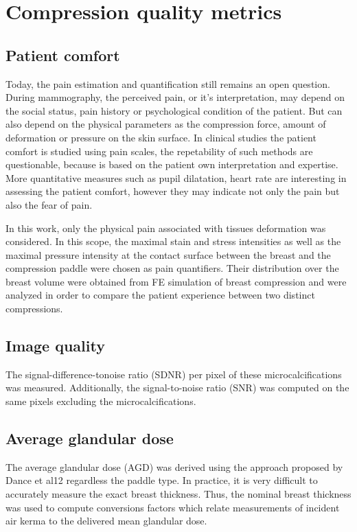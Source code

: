 \section{Compression quality metrics}\label{section:compressionqualitymetrics}
\subsection{Patient comfort}

Today, the pain estimation and quantification still remains an open question. During mammography, the perceived pain, or it's interpretation, may depend on the social status, pain history or psychological condition of the patient. But can also depend on the physical parameters as the compression force, amount of deformation or pressure on the skin surface. In clinical studies the patient comfort is studied using pain scales, the repetability of such methods are questionable, because is based on the patient own interpretation and expertise. More quantitative measures such as pupil dilatation, heart rate are interesting in assessing the patient comfort, however they may indicate not only the pain but also the fear of  pain.        

In this work, only the physical pain associated with tissues deformation was considered. In this scope, the maximal stain and stress intensities as well as the maximal pressure intensity at the contact surface between the breast and the compression paddle were chosen as pain quantifiers. Their distribution over the breast volume were obtained from FE simulation of breast compression and  were analyzed in order to compare the patient experience between two distinct compressions. 

\subsection{Image quality }\label{section:averagegalndulardose}
 The signal-difference-tonoise ratio (SDNR) per pixel of these microcalcifications was measured. Additionally, the signal-to-noise ratio (SNR) was computed on the same pixels excluding the microcalcifications.  




\subsection{ Average glandular dose}
The average glandular dose (AGD) was derived using the approach proposed by Dance et al12 regardless the paddle type.  In practice, it is very difficult to accurately measure the exact breast thickness. Thus, the nominal breast thickness was used to compute conversions factors which relate measurements of incident air kerma to the delivered mean glandular dose.

